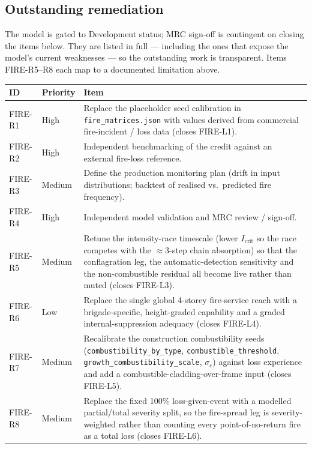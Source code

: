 \documentclass[11pt,a4paper]{article}
\begin{document}
\subsection{Outstanding remediation}

The model is gated to Development status; MRC sign-off is contingent on closing
the items below. They are listed in full --- including the ones that expose the
model's current weaknesses --- so the outstanding work is transparent. Items
FIRE-R5--R8 each map to a documented limitation above.

\begin{tabular}{l l p{}}
\toprule
ID & Priority & Item \\
\midrule
FIRE-R1 & High & Replace the placeholder seed calibration in
\texttt{fire\_matrices.json} with values derived from commercial fire-incident /
loss data (closes FIRE-L1). \\
FIRE-R2 & High & Independent benchmarking of the credit against an external
fire-loss reference. \\
FIRE-R3 & Medium & Define the production monitoring plan (drift in input
distributions; backtest of realised vs.\ predicted fire frequency). \\
FIRE-R4 & High & Independent model validation and MRC review / sign-off. \\
FIRE-R5 & Medium & Retune the intensity-race timescale (lower $I_{\text{crit}}$
so the race competes with the $\approx 3$-step chain absorption) so that the
conflagration leg, the automatic-detection sensitivity and the non-combustible
residual all become live rather than muted (closes FIRE-L3). \\
FIRE-R6 & Low & Replace the single global 4-storey fire-service reach with a
brigade-specific, height-graded capability and a graded internal-suppression
adequacy (closes FIRE-L4). \\
FIRE-R7 & Medium & Recalibrate the construction combustibility seeds
(\texttt{combustibility\_by\_type}, \texttt{combustible\_threshold},
\texttt{growth\_combustibility\_scale}, $\sigma_c$) against loss experience and
add a combustible-cladding-over-frame input (closes FIRE-L5). \\
FIRE-R8 & Medium & Replace the fixed 100\% loss-given-event with a modelled
partial/total severity split, so the fire-spread leg is severity-weighted rather
than counting every point-of-no-return fire as a total loss (closes FIRE-L6). \\
\bottomrule
\end{tabular}
\end{document}
